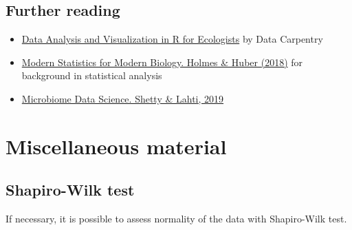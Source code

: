 \documentclass[
  oneside]{book}
\newenvironment{Shaded}{\begin{snugshade}}{\end{snugshade}}
\newcommand{\CommentTok}[1]{\textcolor[rgb]{0.56,0.35,0.01}{\textit{#1}}}
\newcommand{\ControlFlowTok}[1]{\textcolor[rgb]{0.13,0.29,0.53}{\textbf{#1}}}
\newcommand{\FloatTok}[1]{\textcolor[rgb]{0.00,0.00,0.81}{#1}}
\newcommand{\KeywordTok}[1]{\textcolor[rgb]{0.13,0.29,0.53}{\textbf{#1}}}
\newcommand{\NormalTok}[1]{#1}
\newcommand{\OperatorTok}[1]{\textcolor[rgb]{0.81,0.36,0.00}{\textbf{#1}}}
\newcommand{\StringTok}[1]{\textcolor[rgb]{0.31,0.60,0.02}{#1}}
\begin{document}
\hypertarget{further-reading}{%
\section{Further reading}\label{further-reading}}

\begin{itemize}
\item
  \href{https://datacarpentry.org/R-ecology-lesson/}{Data Analysis and Visualization in R for Ecologists} by Data Carpentry
\item
  \href{http://web.stanford.edu/class/bios221/book/}{Modern Statistics for Modern Biology. Holmes \& Huber (2018)} for background in statistical analysis
\item
  \href{https://openresearchlabs.github.io/publications/papers/2018-Shetty-Lahti-MDS.pdf}{Microbiome Data Science. Shetty \& Lahti, 2019}
\end{itemize}

\hypertarget{miscellaneous-material}{%
\chapter{Miscellaneous material}\label{miscellaneous-material}}

\hypertarget{shapiro-wilk-test}{%
\section{Shapiro-Wilk test}\label{shapiro-wilk-test}}

If necessary, it is possible to assess normality of the data with Shapiro-Wilk test.

\begin{Shaded}
\end{Shaded}
\end{document}
